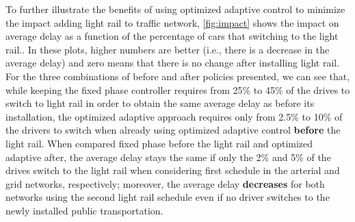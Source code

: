 To further illustrate the benefits of using optimized adaptive control to minimize
the impact adding light rail to traffic network, \cref{fig:impact} shows the
impact on average delay as a function of the percentage of cars that switching
to the light rail..
%
In these plots, higher numbers are better (i.e., there is a decrease in the
average delay) and zero means that there is no change after installing light
rail.
%
For the three combinations of before and after policies presented,
%
%
we can see that, while keeping the fixed phase controller requires from 25\% to
45\% of the drives to switch to light rail in order to obtain the same average
delay as before its installation, the optimized adaptive approach requires only from
2.5\% to 10\% of the drivers to switch when already using optimized adaptive
control \textbf{before} the light rail.
%
When compared fixed phase before the light rail and optimized adaptive after, the
average delay stays the same if only the 2\% and 5\% of the drives switch to the
light rail when considering first schedule in the arterial and grid networks,
respectively;
%
moreover, the average delay \textbf{decreases} for both networks using the
second light rail schedule even if no driver switches to the newly installed
public transportation.

